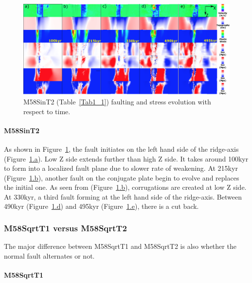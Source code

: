 \begin{figure}[h]
 \centering
  \includegraphics[width=1.0\textwidth]{./Figures/fig_Results_Weakening_6_M58SinT2_time_evolution.eps}
 \caption{M58SinT2 (Table~\hyperref[Tab1_1]{\ref{Tab1_1}}) faulting and stress evolution with respect to time.}
\label{fig_Results_Weakenging_6}
\end{figure}

\paragraph{M58SinT2}\label{para_M58SinT2}

As shown in Figure~\hyperref[fig_Results_Weakenging_6]{\ref{fig_Results_Weakenging_6}}, the fault initiates on the left hand side of the ridge-axis (Figure~\hyperref[fig_Results_Weakenging_6]{\ref{fig_Results_Weakenging_6}.a}). Low Z side extends further than high Z side. It takes around 100kyr to form into a localized fault plane due to slower rate of weakening. At 215kyr (Figure~\hyperref[fig_Results_Weakenging_6]{\ref{fig_Results_Weakenging_6}.b}), another fault on the conjugate plate begin to evolve and replaces the initial one. As seen from (Figure~\hyperref[fig_Results_Weakenging_6]{\ref{fig_Results_Weakenging_6}.b}), corrugations are created at low Z side. At 330kyr, a third fault forming at the left hand side of the ridge-axis. Between 490kyr (Figure~\hyperref[fig_Results_Weakenging_6]{\ref{fig_Results_Weakenging_6}.d}) and 495kyr (Figure~\hyperref[fig_Results_Weakenging_6]{\ref{fig_Results_Weakenging_6}.e}), there is a cut back.

\subsubsection{M58SqrtT1 versus M58SqrtT2}
The major difference between M58SqrtT1 and M58SqrtT2 is also whether the normal fault alternates or not.

\paragraph{M58SqrtT1}\label{para_M58SqrtT1}

